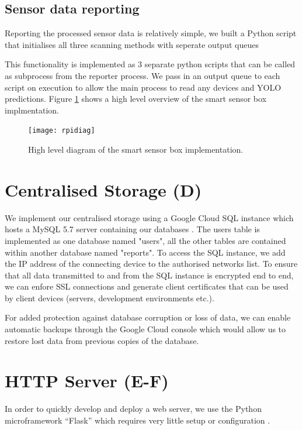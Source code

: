 \documentclass{l4proj}
\begin{document}
\subsection{Sensor data reporting}

Reporting the processed sensor data is relatively simple, we built a Python script that initialises all three scanning methods with seperate output queues

This functionality is implemented as 3 separate python scripts that can be called as subprocess from the reporter process. We pass in an output queue to each script on execution to allow the main process to read any devices and YOLO predictions. Figure \ref{fig:rpidiag} shows a high level overview of the smart sensor box implmentation.

\begin{figure}
\centering
\texttt{[image: rpidiag]}
\caption{High level diagram of the smart sensor box implementation.}
\label{fig:rpidiag}
\end{figure}


\section{Centralised Storage (D)}
We implement our centralised storage using a Google Cloud SQL instance which hosts a MySQL 5.7 server containing our databases \cite{c-gcloud}. The users table is implemented as one database named "users", all the other tables are contained within another database named "reports". To access the SQL instance, we add the IP address of the connecting device to the authorised networks list. To ensure that all data transmitted to and from the SQL instance is encrypted end to end, we can enfore SSL connections and generate client certificates that can be used by client devices (servers, development environments etc.).

For added protection against database corruption or loss of data, we can enable automatic backups through the Google Cloud console which would allow us to restore lost data from previous copies of the database.
 

\section{HTTP Server (E-F)}
In order to quickly develop and deploy a web server, we use the Python microframework “Flask” which requires very little setup or configuration \cite{c-flask}. 
\end{document}
